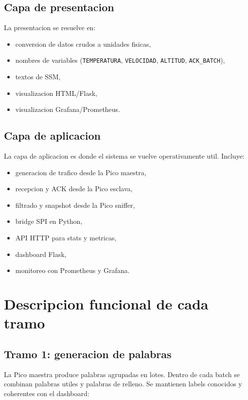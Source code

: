 \documentclass[12pt,a4paper]{report}
\begin{document}
\section{Capa de presentacion}

La presentacion se resuelve en:

\begin{itemize}
    \item conversion de datos crudos a unidades fisicas,
    \item nombres de variables (\texttt{TEMPERATURA}, \texttt{VELOCIDAD}, \texttt{ALTITUD}, \texttt{ACK\_BATCH}),
    \item textos de SSM,
    \item visualizacion HTML/Flask,
    \item visualizacion Grafana/Prometheus.
\end{itemize}

\section{Capa de aplicacion}

La capa de aplicacion es donde el sistema se vuelve operativamente util. Incluye:

\begin{itemize}
    \item generacion de trafico desde la Pico maestra,
    \item recepcion y ACK desde la Pico esclava,
    \item filtrado y snapshot desde la Pico sniffer,
    \item bridge SPI en Python,
    \item API HTTP para stats y metricas,
    \item dashboard Flask,
    \item monitoreo con Prometheus y Grafana.
\end{itemize}

\chapter{Descripcion funcional de cada tramo}

\section{Tramo 1: generacion de palabras}

La Pico maestra produce palabras agrupadas en lotes. Dentro de cada batch se combinan palabras utiles y palabras de relleno. Se mantienen labels conocidos y coherentes con el dashboard:
\end{document}
